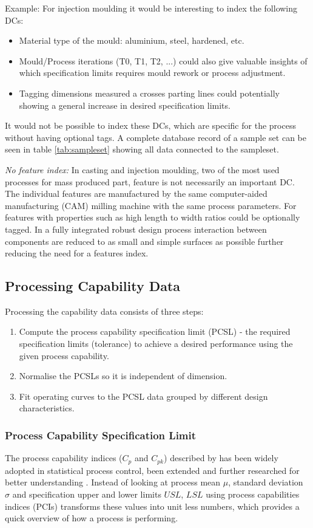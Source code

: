 \documentclass[aip,amsmath, preprint, author-year]{revtex4-1}
\begin{document}
Example: For injection moulding it would be interesting to index the following DCs:
\begin{itemize}
\item Material type of the mould: aluminium, steel, hardened, etc.
\item Mould/Process iterations (T0, T1, T2, ...) could also give valuable insights of which specification limits requires mould rework or process adjustment. 
\item Tagging dimensions measured a crosses parting lines could potentially showing a general increase in desired specification limits.
\end{itemize}
It would not be possible to index these DCs, which are specific for the process without having optional tags. 
A complete database record of a sample set can be seen in table \ref{tab:sampleset} showing all data connected to the sampleset. 

\emph{No feature index:}
In casting and injection moulding, two of the most used processes for mass produced part, feature is not necessarily an important DC. 
The individual features are manufactured by the same computer-aided manufacturing (CAM) milling machine with the same process parameters. 
For features with properties such as high length to width ratios could be optionally tagged. 
In a fully integrated robust design process interaction between components are reduced to as small and simple surfaces as possible further reducing the need for a features index.

\subsection{Processing Capability Data}

Processing the capability data consists of three steps: 

\begin{enumerate}
	\item Compute the process capability specification limit (PCSL) - the required specification limits (tolerance) to achieve a desired performance using the given process capability.
	\item Normalise the PCSLs so it is independent of dimension.
	\item Fit operating curves to the PCSL data grouped by different design characteristics.
\end{enumerate}

\subsubsection{Process Capability Specification Limit}
The process capability indices ($C_p$ and $C_{pk}$) described by \cite{kane1986process} has been widely adopted in statistical process control, been extended and further researched for better understanding \citep{wu2009overview}. 
Instead of looking at process mean $\mu$, standard deviation $\sigma$ and specification upper and lower limits $USL$, $LSL$ using process capabilities indices (PCIs) transforms these values into unit less numbers, which provides a quick overview of how a process is performing.
\end{document}
